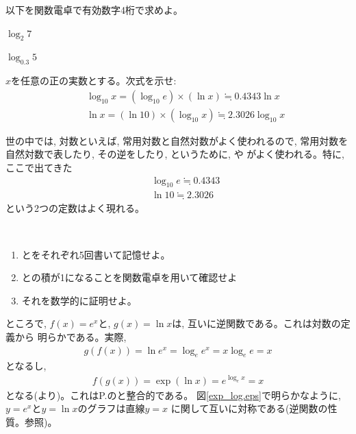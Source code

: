 \begin{q}\label{q:exp_logvalue} 以下を関数電卓で有効数字4桁で求めよ。
\begin{edaenumerate}
\item $\log_2 7$
\item $\log_{0.3} 5$
\end{edaenumerate}
\end{q}
\mv

\begin{q}\label{q:exp_log_ln} $x$を任意の正の実数とする。次式を示せ:
\begin{eqnarray}
&&\log_{10} x=(\log_{10} e)\times(\ln x)\fallingdotseq0.4343\ln x\label{eq:log2ln}\\
&&\ln x=(\ln 10)\times(\log_{10} x)\fallingdotseq2.3026\log_{10} x\label{eq:ln2log}
\end{eqnarray}\end{q}
\mv

世の中では, 対数といえば, 常用対数と自然対数がよく使われるので, 常用対数を
自然対数で表したり, その逆をしたり, というために, や
がよく使われる。特に, ここで出てきた
\begin{eqnarray}
&&\log_{10} e\fallingdotseq0.4343\label{eq:log10e}\\
&&\ln 10\fallingdotseq2.3026\label{eq:ln10}
\end{eqnarray}
という2つの定数はよく現れる。

\begin{q}\label{q:log10e_ln10}　
\begin{enumerate}
\item {}とをそれぞれ5回書いて記憶せよ。
\item {}との積が1になることを関数電卓を用いて確認せよ
\item それを数学的に証明せよ。
\end{enumerate}
\end{q}
\mv

ところで, $f(x)=e^x$と, $g(x)=\ln x$は, 互いに逆関数である。これは対数の定義から
明らかである。実際, 
\begin{eqnarray*}g(f(x))=\ln e^x=\log_e e^x=x\log_e e=x\end{eqnarray*}
となるし, 
\begin{eqnarray*}f(g(x))=\exp(\ln x)=e^{\log_e x}=x\end{eqnarray*}
となる(より)。これはP.\pageref{eq:generaleq}のと整合的である。
図\ref{exp_log.eps}で明らかなように, $y=e^x$と$y=\ln x$のグラフは直線$y=x$
に関して互いに対称である(逆関数の性質。参照)。

